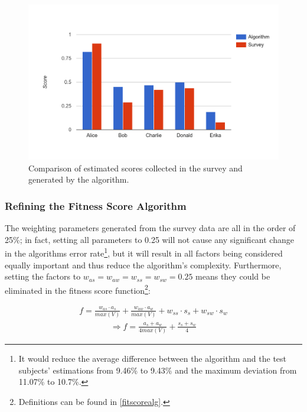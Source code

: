 \begin{figure}[t]
    \centering
    \includegraphics[width=\textwidth]{images/survey_vs_alg.png}
    \caption[Diagram: Comparison of Survey and Algorithm]{Comparison of estimated scores collected in the survey and generated by the algorithm.}
    \label{survey:compare}
\end{figure}


\subsubsection{Refining the Fitness Score Algorithm}
The weighting parameters generated from the survey data are all in the order of 25\%; in fact, setting all parameters to 0.25 will not cause any significant change in the algorithms error rate\footnote{It would reduce the average difference between the algorithm and the test subjects' estimations from 9.46\% to 9.43\% and the maximum deviation from 11.07\% to 10.7\%.}, but it will result in all factors being considered equally important and thus reduce the algorithm's complexity.
Furthermore, setting the factors to $w_{as} = w_{aw} = w_{ss} = w_{sw} = 0.25$ means they could be eliminated in the fitness score function\footnote{Definitions can be found in \ref{fitscorealg}.}:

\begin{gather*}
  f = \frac{w_{as} \cdot a_s}{max(V)} + \frac{w_{aw} \cdot a_w}{max(V)} + w_{ss} \cdot s_s + w_{sw} \cdot s_w
\end{gather*}
\begin{gather*}
	\Rightarrow f = \frac{a_s + a_w}{4 max(V)} + \frac{s_s + s_w}{4}
\end{gather*}

